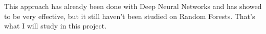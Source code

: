 \documentclass[a4paper]{article}
\begin{document}
    This approach has already been done with Deep Neural Networks\cite{RFF-NN} and has showed to be very effective, but it still haven't been studied on Random Forests. That's what I will study in this project.




\end{document}

